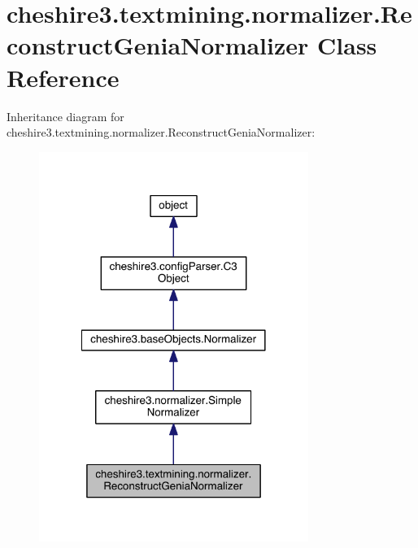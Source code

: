 \hypertarget{classcheshire3_1_1textmining_1_1normalizer_1_1_reconstruct_genia_normalizer}{\section{cheshire3.\-textmining.\-normalizer.\-Reconstruct\-Genia\-Normalizer Class Reference}
\label{classcheshire3_1_1textmining_1_1normalizer_1_1_reconstruct_genia_normalizer}
}


Inheritance diagram for cheshire3.\-textmining.\-normalizer.\-Reconstruct\-Genia\-Normalizer\-:
\nopagebreak
\begin{figure}[H]
\begin{center}
\leavevmode
\includegraphics[width=248pt]{classcheshire3_1_1textmining_1_1normalizer_1_1_reconstruct_genia_normalizer__inherit__graph}
\end{center}
\end{figure}


